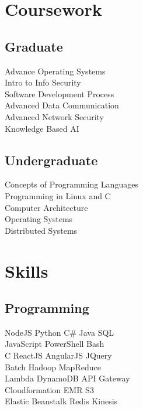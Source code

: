 \documentclass[]{deedy-resume-openfont}
\begin{document}
\begin{minipage}[t]{0.33\textwidth}

\section{Coursework}
\subsection{Graduate}
Advance Operating Systems \\
Intro to Info Security \\
Software Development Process \\
Advanced Data Communication \\
Advanced Network Security \\
Knowledge Based AI
\sectionsep
\subsection{Undergraduate}
Concepts of Programming Languages \\
Programming in Linux and C \\
Computer Architecture \\
Operating Systems \\
Distributed Systems
\sectionsep


\section{Skills}
\subsection{Programming}

NodeJS \textbullet{} Python \textbullet{} C\# \textbullet{} Java \textbullet{} SQL \\
JavaScript \textbullet{} PowerShell \textbullet{} Bash \\

C \textbullet{} ReactJS \textbullet{} AngularJS \textbullet{} JQuery \\
Batch \textbullet{} Hadoop MapReduce \\

Lambda \textbullet{} DynamoDB \textbullet{} API Gateway  \\
Cloudformation \textbullet{} EMR \textbullet{} S3 \\
Elastic Beanstalk \textbullet{} Redis \textbullet{} Kinesis \\


\end{minipage}
\end{document}
